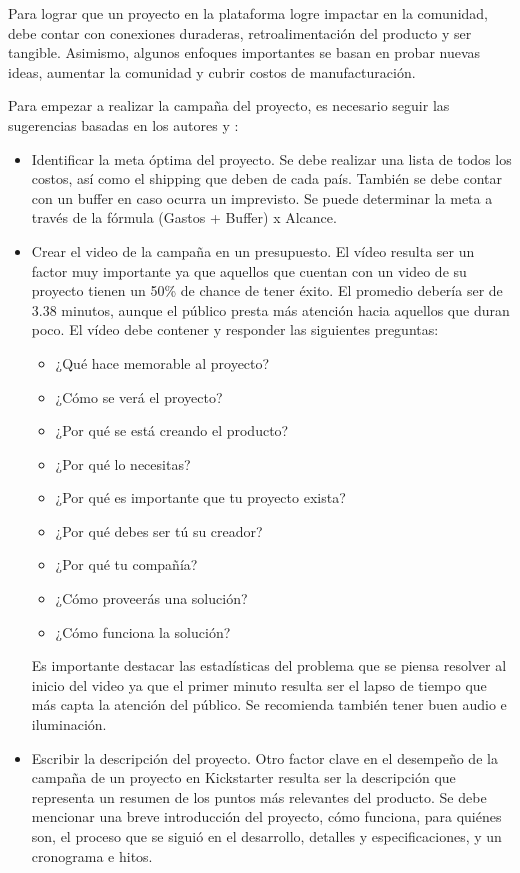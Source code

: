 Para lograr que un proyecto en la plataforma logre impactar en la comunidad, debe contar con conexiones duraderas, retroalimentación del producto y ser tangible. Asimismo, algunos enfoques importantes se basan en probar nuevas ideas, aumentar la comunidad y cubrir costos de manufacturación.

Para empezar a realizar la campaña del proyecto, es necesario seguir las sugerencias basadas en los autores \cite{cr_yu2017kickstarter_course} y \cite{cr_kickstarter_intro}:
\begin{itemize}
	\item Identificar la meta óptima del proyecto. Se debe realizar una lista de todos los costos, así como el shipping que deben de cada país. También se debe contar con un buffer en caso ocurra un imprevisto. Se puede determinar la meta a través de la fórmula (Gastos + Buffer) x Alcance.
	\item Crear el video de la campaña en un presupuesto. El vídeo resulta ser un factor muy importante ya que aquellos que cuentan con un video de su proyecto tienen un 50\% de chance de tener éxito. El promedio debería ser de 3.38 minutos, aunque el público presta más atención hacia aquellos que duran poco. El vídeo debe contener y responder las siguientes preguntas:
	\begin{itemize}
		\item ¿Qué hace memorable al proyecto?
		\item ¿Cómo se verá el proyecto?
		\item ¿Por qué se está creando el producto?
		\item ¿Por qué lo necesitas?
		\item ¿Por qué es importante que tu proyecto exista?
		\item ¿Por qué debes ser tú su creador?
		\item ¿Por qué tu compañía?
		\item ¿Cómo proveerás una solución?
		\item ¿Cómo funciona la solución?
	\end{itemize}
	Es importante destacar las estadísticas del problema que se piensa resolver al inicio del video ya que el primer minuto resulta ser el lapso de tiempo que más capta la atención del público. Se recomienda también tener buen audio e iluminación.
	\item Escribir la descripción del proyecto. Otro factor clave en el desempeño de la campaña de un proyecto en Kickstarter resulta ser la descripción que representa un resumen de los puntos más relevantes del producto. Se debe mencionar una breve introducción del proyecto, cómo funciona, para quiénes son, el proceso que se siguió en el desarrollo, detalles y especificaciones, y un cronograma e hitos.

\end{itemize}

